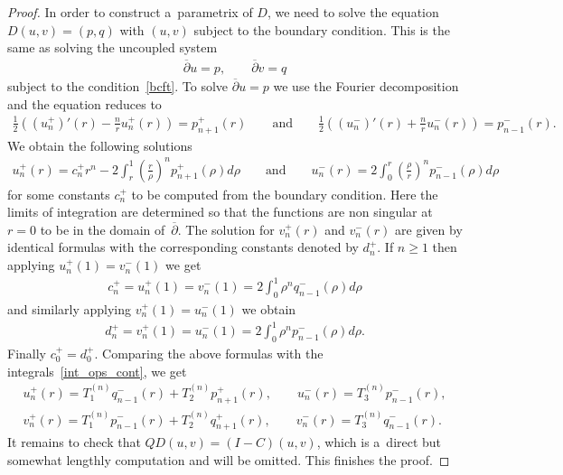 \documentclass[pdftex]{sigma}
\numberwithin{equation}{section}
\begin{document}
\begin{proof}
In order to construct a~parametrix of $D$, we need to solve the equation $D(u,v) = (p,q)$ with $(u,v)$ subject to the
boundary condition.
This is the same as solving the uncoupled system
\begin{gather*}
\overline{\partial}u = p,
\qquad
\overline{\partial}v = q
\end{gather*}
subject to the condition~\eqref{bcft}.
To solve $\overline{\partial}u=p$ we use the Fourier decomposition and the equation reduces to
\begin{gather*}
\frac{1}{2}\left((u_n^+)'(r) - \frac{n}{r}u_n^+(r)\right) = p_{n+1}^+(r)
\qquad
\textrm{and}
\qquad
\frac{1}{2}\left((u_n^-)'(r) + \frac{n}{r}u_n^-(r)\right) = p_{n-1}^-(r).
\end{gather*}
We obtain the following solutions
\begin{gather*}
u_n^+(r) = c_n^+ r^n - 2\int_{r}^{1} \left(\frac{r}{\rho}\right)^n p_{n+1}^+(\rho)d \rho
\qquad
\textrm{and}
\qquad
u_n^-(r) = 2\int_{0}^{r} \left(\frac{\rho}{r}\right)^n p_{n-1}^-(\rho)d \rho
\end{gather*}
for some constants $c_n^+$ to be computed from the boundary condition.
Here the limits of integration are determined so that the functions are non singular at $r=0$ to be in the domain of~$\overline{\partial}$.
The solution for $v_n^+(r)$ and $v_n^-(r)$ are given by identical formulas with the corresponding constants denoted by
$d_n^+$.
If $n\ge1$ then applying $u_n^+(1) = v_n^-(1)$ we get
\begin{gather*}
c_n^+ = u_n^+(1) = v_n^-(1) = 2\int_0^1 \rho^n q_{n-1}^-(\rho)d\rho
\end{gather*}
and similarly applying $v_n^+(1) = u_n^-(1)$ we obtain
\begin{gather*}
d_n^+ = v_n^+(1) = u_n^-(1) = 2\int_0^1 \rho^n p_{n-1}^-(\rho)d\rho.
\end{gather*}
Finally $c_0^+=d_0^+$.
Comparing the above formulas with the integrals~\eqref{int_ops_cont}, we get
\begin{gather*}
u_n^+(r) = T_1^{(n)}q_{n-1}^-(r) + T_2^{(n)}p_{n+1}^+(r),
\qquad
u_n^-(r) = T_3^{(n)}p_{n-1}^-(r),
\\
v_n^+(r) = T_1^{(n)}p_{n-1}^-(r) + T_2^{(n)}q_{n+1}^+(r),
\qquad
v_n^-(r) = T_3^{(n)}q_{n-1}^-(r).
\end{gather*}
It remains to check that $QD(u,v) = (I-C)(u,v)$, which is a~direct but somewhat lengthly computation and will be
omitted.
This f\/inishes the proof.
\end{proof}
\end{document}
